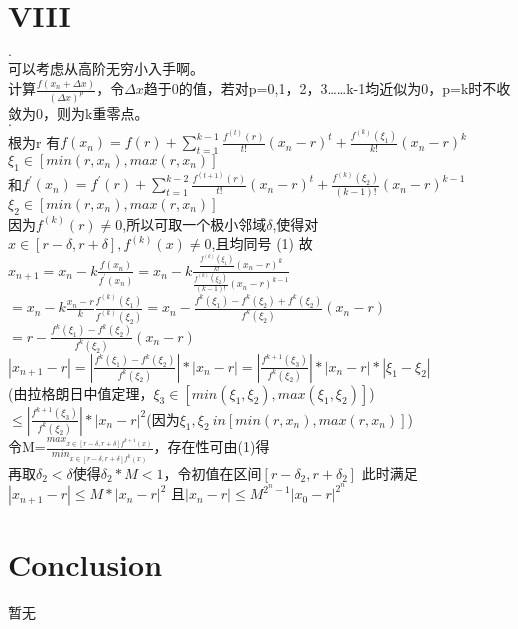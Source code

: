 \documentclass{article}
\begin{document}
\section*{VIII}
\begin{flushleft}
\textbf{$\cdot$\\}  
  可以考虑从高阶无穷小入手啊。\\
  计算$\frac{f(x_n+\Delta x)}{(\Delta x)^p}$，令$\Delta x$趋于0的值，若对p=0,1，2，3……k-1均近似为0，p=k时不收敛为0，则为k重零点。\\

\textbf{$\cdot$\\}  
  根为r
  有$f(x_n)=f(r)+\sum_{t=1}^{k-1}\frac{f^{(t)}(r)}{t!}(x_n-r)^t+\frac{f^{(k)}(\xi_1)}{k!}(x_n-r)^k$\\
  $\xi_1 \in [min(r,x_n),max(r,x_n)]$\\
  和$f^{'}(x_n)=f^{'}(r)+\sum_{t=1}^{k-2}\frac{f^{(t+1)}(r)}{t!}(x_n-r)^t+\frac{f^{(k)}(\xi_2)}{(k-1)!}(x_n-r)^{k-1}$
  $\xi_2 \in [min(r,x_n),max(r,x_n)]$\\
  因为$f^{(k)}(r) \neq 0$,所以可取一个极小邻域$\delta$,使得对$x \in [r-\delta,r+\delta], f^{(k)}(x) \neq 0$,且均同号  \hfill(1)
  故$x_{n+1}=x_n-k\frac{f(x_n)}{f^{'}(x_n)}=x_n-k\frac{\frac{f^{(k)}(\xi_1)}{k!}(x_n-r)^k}{\frac{f^{(k)}(\xi_2)}{(k-1)!}(x_n-r)^{k-1}}$\\
  $=x_n-k\frac{x_n-r}{k}\frac{f^{(k)}(\xi_1)}{f^{(k)}(\xi_2)}=x_n-\frac{f^{k}(\xi_1)-f^{k}(\xi_2)+f^{k}(\xi_2)}{f^{k}(\xi_2)}(x_n-r)$\\
  $=r-\frac{f^{k}(\xi_1)-f^{k}(\xi_2)}{f^{k}(\xi_2)}(x_n-r)$\\
  $|x_{n+1}-r|=|\frac{f^{k}(\xi_1)-f^{k}(\xi_2)}{f^{k}(\xi_2)}|*|x_n-r|=|\frac{f^{k+1}(\xi_3)}{f^{k}(\xi_2)}|*|x_n-r|*|\xi_1-\xi_2|$\\
  (由拉格朗日中值定理，$\xi_3 \in [min(\xi_1,\xi_2),max(\xi_1,\xi_2)]$)\\
  $\leq|\frac{f^{k+1}(\xi_3)}{f^{k}(\xi_2)}|*|x_n-r|^2$(因为$\xi_1,\xi_2 \ in [min(r,x_n),max(r,x_n)]$)\\
  令M=$\frac{max_{x\in[r-\delta,r+\delta]f^{k+1}(x)}}{min_{x\in[r-\delta,r+\delta]f^{k}(x)}}$，存在性可由(1)得\\
  再取$\delta_2<\delta$使得$\delta_2*M<1$，令初值在区间$[r-\delta_2,r+\delta_2]$
  此时满足$|x_{n+1}-r|\leq M*|x_n-r|^2$
  且$|x_n-r|\leq M^{2^n-1}|x_0-r|^{2^{n}}$
  
\end{flushleft}



\section*{Conclusion}
暂无
\end{document}
